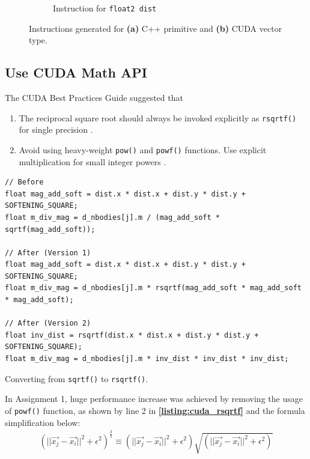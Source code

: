 \documentclass[12pt, a4paper]{article}
\let\oldcref\cref
\renewcommand{\cref}[1]{\textbf{\oldcref{#1}}}
\begin{document}
\begin{figure}[ht]
\begin{subfigure}{.5\textwidth}
    \caption{Instruction for \texttt{float2 dist}}
  \end{subfigure}
  \caption{Instructions generated for \textbf{(a)} C++ primitive and \textbf{(b)} CUDA vector type.}
  \label{figure:cuda_vector_type}
\end{figure}

\subsection{Use CUDA Math API} \label{subsec:cuda_math_api}
The CUDA Best Practices Guide suggested that
\begin{enumerate}
  \item The reciprocal square root should always be invoked explicitly as \texttt{rsqrtf()} for
  single precision \cite{cuda_best_practices_reciprocal_sqrt}.
  \item Avoid using heavy-weight \texttt{pow()} and \texttt{powf()} functions. Use explicit
  multiplication for small integer powers \cite{cuda_best_practices_math_libraries}.
\end{enumerate}

\begin{listing}[H]
  \begin{verbatim}
// Before
float mag_add_soft = dist.x * dist.x + dist.y * dist.y + SOFTENING_SQUARE;
float m_div_mag = d_nbodies[j].m / (mag_add_soft * sqrtf(mag_add_soft));

// After (Version 1)
float mag_add_soft = dist.x * dist.x + dist.y * dist.y + SOFTENING_SQUARE;
float m_div_mag = d_nbodies[j].m * rsqrtf(mag_add_soft * mag_add_soft * mag_add_soft);

// After (Version 2)
float inv_dist = rsqrtf(dist.x * dist.x + dist.y * dist.y + SOFTENING_SQUARE);
float m_div_mag = d_nbodies[j].m * inv_dist * inv_dist * inv_dist;
  \end{verbatim}
  \caption{Converting from \texttt{sqrtf()} to \texttt{rsqrtf()}.}
  \label{listing:cuda_rsqrtf}
\end{listing}

In Assignment 1, huge performance increase was achieved by removing the usage of \texttt{powf()}
function, as shown by line 2 in \cref{listing:cuda_rsqrtf} and the formula simplification below:
\begin{equation*}
  \begin{aligned}
    (||\vec{x_j} - \vec{x_i}||^2 + \epsilon^2)^\frac{3}{2} \equiv (||\vec{x_j} - \vec{x_i}||^2 + \epsilon^2)\sqrt{(||\vec{x_j} - \vec{x_i}||^2 + \epsilon^2)} \\
  \end{aligned}
\end{equation*}
\end{document}
